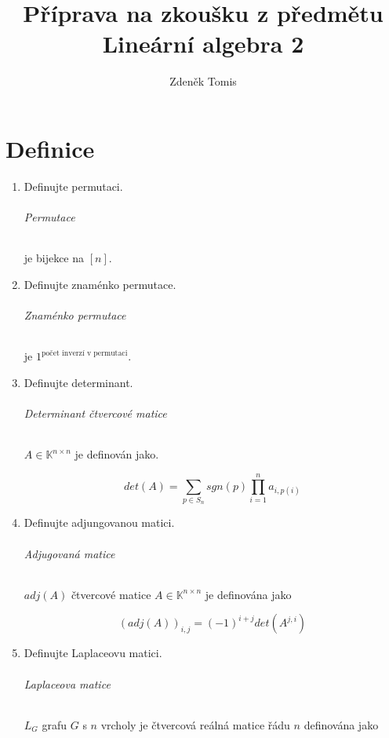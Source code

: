 \documentclass[10pt,a4paper]{article}
\title{Příprava na zkoušku z předmětu Lineární algebra 2}
\author{Zdeněk Tomis}
\date{}
\theoremstyle{plain}
\begin{document}
\maketitle

\part{Definice}

\begin{enumerate}

\item Definujte permutaci.

\paragraph{Permutace} je bijekce na $[n]$.

\item Definujte znaménko permutace.

\paragraph{Znaménko permutace} je $1^\text{počet inverzí v permutaci}$.

\item Definujte determinant.

\paragraph{Determinant čtvercové matice} $A \in \mathbb{K}^{n \times n}$ je definován jako.

\[ det(A) = \sum_{p \in S_n} sgn(p) \prod^n_{i = 1} a_{i, p(i)} \]

\item Definujte adjungovanou matici.

\paragraph{Adjugovaná matice} $adj(A)$ čtvercové matice  $A \in \mathbb{K}^{n \times n}$ je definována jako

\[ (adj(A))_{i,j} = (-1)^{i+j} det(A^{j,i})\]
\item Definujte Laplaceovu matici.

\paragraph{Laplaceova matice} $L_G$ grafu $G$ s $n$ vrcholy je čtvercová reálná matice řádu $n$ definována jako


\end{enumerate}
\end{document}
